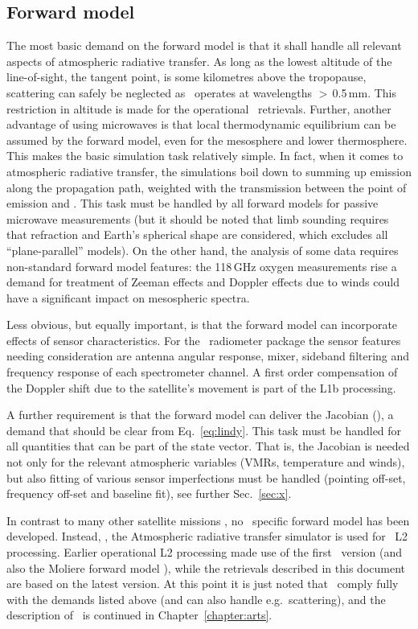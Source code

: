 \subsection{Forward model}
\label{sec:setup:forward}
%
The most basic demand on the forward model is that it shall handle all relevant
aspects of atmospheric radiative transfer. As long as the lowest altitude of
the line-of-sight, the tangent point, is some kilometres above the tropopause,
scattering can safely be neglected as \smr\ operates at wavelengths
$>$\,0.5\,mm. This restriction in altitude is made for the operational \smr\
retrievals. Further, another advantage of using microwaves is that local
thermodynamic equilibrium can be assumed by the forward model, even for the
mesosphere and lower thermosphere. This makes the basic simulation task
relatively simple. In fact, when it comes to atmospheric radiative transfer,
the simulations boil down to summing up emission along the propagation path,
weighted with the transmission between the point of emission and \smr. This
task must be handled by all forward models for passive microwave measurements
(but it should be noted that limb sounding requires that refraction and Earth's
spherical shape are considered, which excludes all ``plane-parallel'' models).
On the other hand, the analysis of some data requires non-standard forward
model features: the 118\,GHz oxygen measurements rise a demand for treatment of
Zeeman effects and Doppler effects due to winds could have a significant impact
on mesospheric spectra.

Less obvious, but equally important, is that the forward model can incorporate
effects of sensor characteristics. For the \smr\ radiometer package the sensor
features needing consideration are antenna angular response, mixer, sideband
filtering and frequency response of each spectrometer channel. A first order
compensation of the Doppler shift due to the satellite's movement is part of
the L1b processing.

A further requirement is that the forward model can deliver the Jacobian
(\aWfnMtr{\SttVct}), a demand that should be clear from Eq.~\ref{eq:lindy}.
This task must be handled for all quantities that can be part of the state
vector. That is, the Jacobian is needed not only for the relevant atmospheric
variables (VMRs, temperature and winds), but also fitting of various sensor
imperfections must be handled (pointing off-set, frequency off-set and baseline
fit), see further Sec.~\ref{sec:x}.

In contrast to many other satellite missions \citep[e.g.][]{read2006clear}, no
\smr\ specific forward model has been developed. Instead, \ARTS, the
Atmospheric radiative transfer simulator
\citep{buehler:artst:05,eriksson:arts2:11} is used for \smr\ L2 processing.
Earlier operational L2 processing \citep{urban:odins:05-b} made use of the
first \ARTS\ version (and also the Moliere forward model
\citep{urban2004moliere}), while the retrievals described in this document are
based on the latest version. At this point it is just noted that \ARTS\ comply
fully with the demands listed above (and can also handle e.g.\ scattering), and
the description of \ARTS\ is continued in Chapter~\ref{chapter:arts}.




